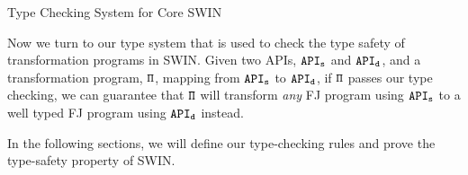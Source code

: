 \begin{section}{Type Checking System for Core SWIN}
\label{tw-type}

Now we turn to our type system that is used to check the type safety
of transformation programs in SWIN. Given two APIs, $\tt API_s$ and
$\tt API_d$, and a transformation program, $\tt\Pi$, mapping from $\tt
API_s$ to $\tt API_d$, if $\tt\Pi$ passes our type checking, we can
guarantee that $\tt\Pi$ will transform {\em any} FJ program using $\tt
API_s$ to a well typed FJ program using $\tt API_d$ instead. %


%
%
In the following sections, we will define our type-checking rules and 
prove the type-safety property of SWIN.

\begin{figure}[htb!]


\end{figure}
\end{section}

